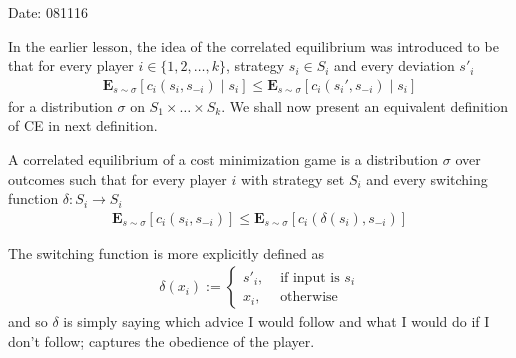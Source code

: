 \begin{flushright}
Date: 081116
\end{flushright}


In the earlier lesson, the idea of the correlated equilibrium was introduced to be that for every player $i \in \{1,2,\ldots ,k\}$, strategy $s_i\in S_i$ and every deviation $s'_i$ 
\begin{align*}
\mathbf{E}_{s \sim \sigma}[c_i(s_i,s_{-i})\mid s_i] \leq \mathbf{E}_{s \sim \sigma}[c_i(s_i',s_{-i})\mid s_i]
\end{align*}
for a distribution $\sigma$ on $S_1 \times \ldots \times S_k$. We shall now present an equivalent definition of CE in next definition.


\begin{defn}
A correlated equilibrium of a cost minimization game is a distribution $\sigma$ over outcomes such that for every player $i$ with strategy set $S_i$ and every switching function $\delta: S_i \to S_i$
\begin{align*}
\mathbf{E}_{s \sim \sigma}[c_i(s_i,s_{-i})] \leq \mathbf{E}_{s \sim \sigma}[c_i(\delta(s_i),s_{-i})]
\end{align*}
\end{defn}


The switching function is more explicitly defined as 
\begin{align*}
\delta(x_i):=\begin{cases}
s'_i, &\text{ if input is $s_i$}\\
x_i, & \text{ otherwise}
\end{cases}
\end{align*}
and so $\delta$ is simply saying which advice I would follow and what I would do if I don't follow; captures the obedience of the player.  


